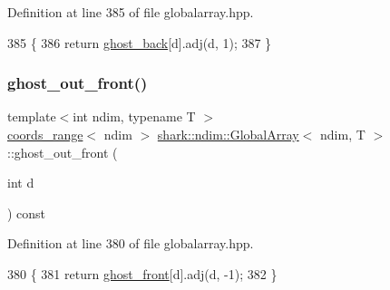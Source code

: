 Definition at line 385 of file globalarray.\+hpp.


\begin{DoxyCode}
385                                                                                  \{
386                     \textcolor{keywordflow}{return} \hyperlink{classshark_1_1ndim_1_1_global_array_a97eb47a8cd80d98627706e673259a310}{ghost\_back}[d].adj(d, 1);
387                 \}
\end{DoxyCode}
\hypertarget{classshark_1_1ndim_1_1_global_array_ad004cd3a0deeaee55d7f3590063d5a20}{}\label{classshark_1_1ndim_1_1_global_array_ad004cd3a0deeaee55d7f3590063d5a20} 
\subsubsection{\texorpdfstring{ghost\+\_\+out\+\_\+front()}{ghost\_out\_front()}}
{\footnotesize\ttfamily template$<$int ndim, typename T $>$ \\
\hyperlink{structshark_1_1ndim_1_1coords__range}{coords\+\_\+range}$<$ ndim $>$ \hyperlink{classshark_1_1ndim_1_1_global_array}{shark\+::ndim\+::\+Global\+Array}$<$ ndim, T $>$\+::ghost\+\_\+out\+\_\+front (\begin{DoxyParamCaption}\item[{int}]{d }\end{DoxyParamCaption}) const\hspace{0.3cm}{\ttfamily [inline]}}



Definition at line 380 of file globalarray.\+hpp.


\begin{DoxyCode}
380                                                                                   \{
381                     \textcolor{keywordflow}{return} \hyperlink{classshark_1_1ndim_1_1_global_array_a48ce861293f294f003ef16ebd49eb942}{ghost\_front}[d].adj(d, -1);
382                 \}
\end{DoxyCode}
\hypertarget{classshark_1_1ndim_1_1_global_array_a5331f21887f3c14791b758e99656a676}{}\label{classshark_1_1ndim_1_1_global_array_a5331f21887f3c14791b758e99656a676} 
